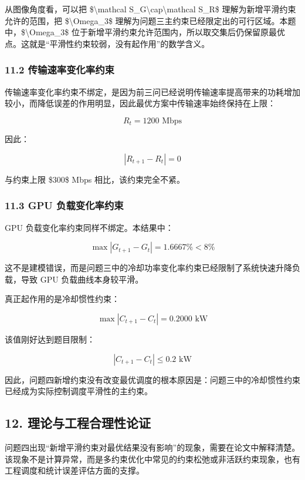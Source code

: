 \documentclass[
]{article}
\begin{document}
从图像角度看，可以把 \$\textbackslash mathcal
S\_G\textbackslash cap\textbackslash mathcal S\_R\$
理解为新增平滑约束允许的范围，把 \$\textbackslash Omega\_3\$
理解为问题三主约束已经限定出的可行区域。本题中，\$\textbackslash Omega\_3\$
位于新增平滑约束允许范围内，所以取交集后仍保留原最优点。这就是``平滑性约束较弱，没有起作用''的数学含义。

\subsubsection{11.2
传输速率变化率约束}\label{112-ux4f20ux8f93ux901fux7387ux53d8ux5316ux7387ux7ea6ux675f}

传输速率变化率约束不绑定，是因为前三问已经说明传输速率提高带来的功耗增加较小，而降低误差的作用明显，因此最优方案中传输速率始终保持在上限：

\[R_t=1200\text{ Mbps}\]

因此：

\[|R_{t+1}-R_t|=0\]

与约束上限 \$300\$ Mbps 相比，该约束完全不紧。

\subsubsection{11.3 GPU
负载变化率约束}\label{113-gpu-ux8d1fux8f7dux53d8ux5316ux7387ux7ea6ux675f}

GPU 负载变化率约束同样不绑定。本结果中：

\[\max |G_{t+1}-G_t|=1.6667\%<8\%\]

这不是建模错误，而是问题三中的冷却功率变化率约束已经限制了系统快速升降负载，导致
GPU 负载曲线本身较平滑。

真正起作用的是冷却惯性约束：

\[\max |C_{t+1}-C_t|=0.2000\text{ kW}\]

该值刚好达到题目限制：

\[|C_{t+1}-C_t|\le 0.2\text{ kW}\]

因此，问题四新增约束没有改变最优调度的根本原因是：问题三中的冷却惯性约束已经成为实际控制调度平滑性的主约束。

\subsection{12.
理论与工程合理性论证}\label{12-ux7406ux8bbaux4e0eux5de5ux7a0bux5408ux7406ux6027ux8bbaux8bc1}

问题四出现``新增平滑约束对最优结果没有影响''的现象，需要在论文中解释清楚。该现象不是计算异常，而是多约束优化中常见的约束松弛或非活跃约束现象，也有工程调度和统计误差评估方面的支撑。
\end{document}
